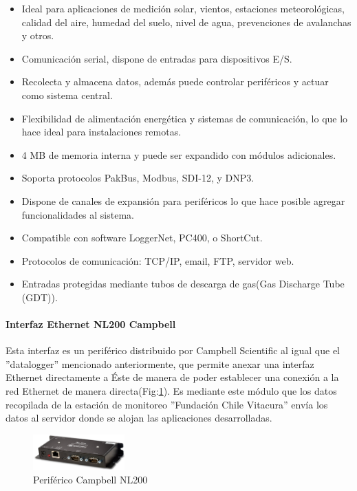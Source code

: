 \begin{itemize}
\item Ideal para aplicaciones de medición solar, vientos, estaciones meteorológicas, calidad del aire, humedad del suelo, nivel de agua, prevenciones de avalanchas y otros.
\item Comunicación serial, dispone de entradas para dispositivos E/S.
\item Recolecta y almacena datos, además puede controlar periféricos y actuar como sistema central.
\item Flexibilidad de alimentación energética y sistemas de comunicación, lo que lo hace ideal para instalaciones remotas.
\item 4 MB de memoria interna y puede ser expandido con módulos adicionales.
\item Soporta protocolos PakBus, Modbus, SDI-12, y DNP3.
\item Dispone de canales de expansión para periféricos lo que hace posible agregar funcionalidades al sistema.
\item Compatible con software LoggerNet, PC400, o ShortCut.
\item Protocolos de comunicación: TCP/IP, email, FTP, servidor web.
\item Entradas protegidas mediante tubos de descarga de gas(Gas Discharge Tube (GDT)).
\end{itemize}

\paragraph{Interfaz Ethernet NL200 Campbell}
Esta interfaz es un periférico distribuido por Campbell Scientific al igual que el ''datalogger'' mencionado anteriormente, que permite anexar una interfaz Ethernet directamente a Éste de manera de poder establecer una conexión a la red Ethernet de manera directa(Fig:\ref{nl200}). Es mediante este módulo que los datos recopilada de la estación de monitoreo ''Fundación Chile Vitacura'' envía los datos al servidor donde se alojan las aplicaciones desarrolladas.\\

\begin{figure}[h!]
        \centering
        \includegraphics[width=100pt]{images/nl200}
        \caption{Periférico Campbell NL200}
	\label{nl200} 
\end{figure}

